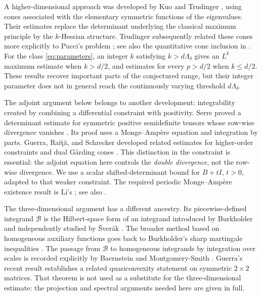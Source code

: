 \documentclass[11pt,a4paper,reqno]{amsart}
\theoremstyle{plain}
\theoremstyle{remark}
\numberwithin{equation}{section}
\newcommand{\lam}{\Lambda_\delta}
\begin{document}
A higher-dimensional approach was developed by Kuo and Trudinger \cite[Theorem~1.1]{KuoTrudinger2007}, using cones associated with the elementary symmetric functions of the eigenvalues. Their estimates replace the determinant underlying the classical maximum principle by the $k$-Hessian structure. Trudinger subsequently related these cones more explicitly to Pucci's problem \cite{Trudinger2020}; see also the quantitative cone inclusion in \cite[Section~5]{Trudinger2024}. For the class \eqref{eq:parameters}, an integer $k$ satisfying $k>d\lam$ gives an $L^k$ maximum estimate when $k>d/2$, and estimates for every $p>d/2$ when $k\le d/2$. These results recover important parts of the conjectured range, but their integer parameter does not in general reach the continuously varying threshold $d\lam$.

The adjoint argument below belongs to another development: integrability created by combining a differential constraint with positivity. Serre proved a determinant estimate for symmetric positive semidefinite tensors whose row-wise divergence vanishes \cite[Theorem~2.1]{Serre2018}. Its proof uses a Monge--Amp\`ere equation and integration by parts. Guerra, Rai\c{t}\u{a}, and Schrecker developed related estimates for higher-order constraints and dual G{\aa}rding cones \cite[Theorem~D]{GRS2024}. This distinction in the constraint is essential: the adjoint equation here controls the \emph{double divergence}, not the row-wise divergence. We use a scalar shifted-determinant bound for $B+tI$, $t>0$, adapted to that weaker constraint. The required periodic Monge--Amp\`ere existence result is Li's \cite[Theorem~2.2, p.~248]{Li1990}; see also \cite[Theorem~0.2, p.~99]{CaffarelliLi2004}.

The three-dimensional argument has a different ancestry. Its piecewise-defined integrand $\mathcal B$ is the Hilbert-space form of an integrand introduced by Burkholder \cite{Burkholder1989} and independently studied by \v{S}ver\'ak \cite{Sverak1990}. The broader method based on homogeneous auxiliary functions goes back to Burkholder's sharp martingale inequalities \cite{Burkholder1984}. The passage from $\mathcal B$ to homogeneous integrands by integration over scales is recorded explicitly by Baernstein and Montgomery-Smith \cite[equations~(1.2a)--(1.2b)]{BaernsteinMS1999}. Guerra's recent result \cite[Theorem~1.1]{Guerra2026} establishes a related quasiconvexity statement on symmetric $2\times2$ matrices. That theorem is not used as a substitute for the three-dimensional estimate: the projection and spectral arguments needed here are given in full.
\end{document}
